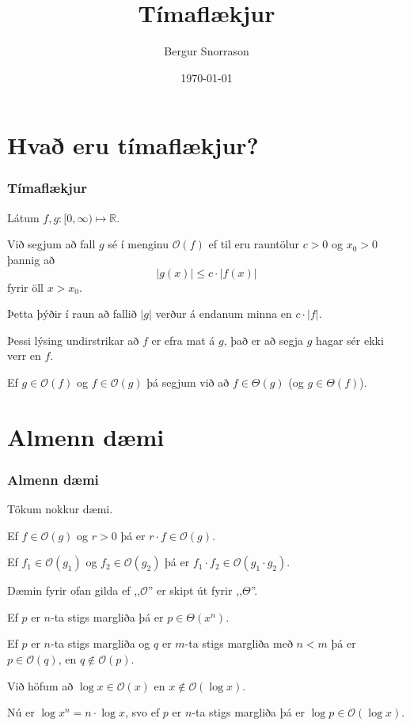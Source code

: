 \title{Tímaflækjur}
\author{Bergur Snorrason}
\date{\today}



\frame{\titlepage}

\section{Hvað eru tímaflækjur?}
{
    \frametitle{Tímaflækjur}
    {
        \item<1-> Látum $f, g \colon [0, \infty) \mapsto \mathbb{R}$.
        \item<2-> Við segjum að fall $g$ sé í menginu $\mathcal{O}(f)$ ef til eru rauntölur $c > 0$ og $x_0 > 0$ þannig að
                    \[
                        |g(x)| \leq c \cdot |f(x)|
                    \]
                    fyrir öll $x > x_0$.
        \item<3-> Þetta þýðir í raun að fallið $|g|$ verður á endanum minna en $c \cdot |f|$.
        \item<4-> Þessi lýsing undirstrikar að $f$ er efra mat á $g$, það er að segja $g$ hagar sér ekki verr en $f$.
        \item<5-> Ef $g \in \mathcal{O}(f)$ og $f \in \mathcal{O}(g)$ þá segjum við að $f \in \Theta(g)$ (og $g \in \Theta(f)$).
    }
}

\section{Almenn dæmi}
{
    \frametitle{Almenn dæmi}
    {
        \item<1-> Tökum nokkur dæmi.
        \item<2-> Ef $f \in \mathcal{O}(g)$ og $r > 0$ þá er $r \cdot f \in \mathcal{O}(g)$.
        \item<3-> Ef $f_1 \in \mathcal{O}(g_1)$ og $f_2 \in \mathcal{O}(g_2)$ þá er $f_1 \cdot f_2 \in \mathcal{O}(g_1 \cdot g_2)$.
        \item<4-> Dæmin fyrir ofan gilda ef ,,$\mathcal{O}$'' er skipt út fyrir ,,$\Theta$''.
        \item<5-> Ef $p$ er $n$-ta stigs margliða þá er $p \in \Theta(x^n)$.
        \item<6-> Ef $p$ er $n$-ta stigs margliða og $q$ er $m$-ta stigs margliða með $n < m$ þá er $p \in \mathcal{O}(q)$,
            en $q \not \in \mathcal{O}(p)$.
        \item<7-> Við höfum að $\log x \in \mathcal{O}(x)$ en $x \not \in \mathcal{O}(\log x)$.
        \item<8-> Nú er $\log x^n = n \cdot \log x$, svo ef $p$ er $n$-ta stigs margliða þá er $\log p \in \mathcal{O}(\log x)$.
    }
}

